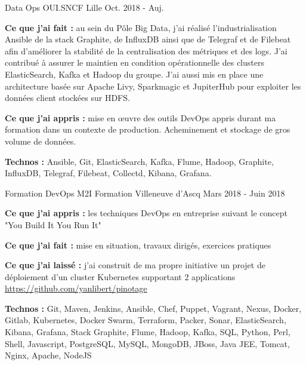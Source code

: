 

\begin{cventries}

  \cventry
    {Data Ops} %
    {OUI.SNCF} %
    {Lille} %
    {Oct. 2018 - Auj.} %
    {
      \begin{cvitems} %
        \item {\textbf{Ce que j'ai fait :} au sein du Pôle Big Data, j'ai réalisé l'industrialisation Ansible de la stack Graphite, de InfluxDB ainsi que de Telegraf et de Filebeat afin d'améliorer la stabilité de la centralisation des métriques et des logs. J'ai contribué à assurer le maintien en condition opérationnelle des clusters ElasticSearch, Kafka et Hadoop du groupe. J'ai aussi mis en place une architecture basée sur Apache Livy, Sparkmagic et JupiterHub pour exploiter les données client stockées sur HDFS.}
        \item {\textbf{Ce que j'ai appris :} mise en \oe uvre des outils DevOps appris durant ma formation dans un contexte de production. Acheminement et stockage de gros volume de données.}
        \item {\textbf{Technos :} Ansible, Git, ElasticSearch, Kafka, Flume, Hadoop, Graphite, InfluxDB, Telegraf, Filebeat, Collectd, Kibana, Grafana.}
      \end{cvitems}
    }

  \cventry
    {Formation DevOps} %
    {M2I Formation} %
    {Villeneuve d'Ascq} %
    {Mars 2018 - Juin 2018} %
    {
      \begin{cvitems} %
        \item {\textbf{Ce que j'ai appris :} les techniques DevOps en entreprise suivant le concept "You Build It You Run It"}
        \item {\textbf{Ce que j'ai fait :} mise en situation, travaux dirigés, exercices pratiques}
        \item {\textbf{Ce que j'ai laissé :} j'ai construit de ma propre initiative un projet de déploiement d'un cluster Kubernetes supportant 2 applications \url{https://github.com/yanlibert/pinotage} }
        \item {\textbf{Technos :} Git, Maven, Jenkins, Ansible, Chef, Puppet, Vagrant, Nexus, Docker, Gitlab, Kubernetes, Docker Swarm, Terraform, Packer, Sonar, ElasticSearch, Kibana, Grafana, Stack Graphite, Flume, Hadoop, Kafka, SQL, Python, Perl, Shell, Javascript, PostgreSQL, MySQL, MongoDB, JBoss, Java JEE, Tomcat, Nginx, Apache, NodeJS}
      \end{cvitems}
    }


\end{cventries}
